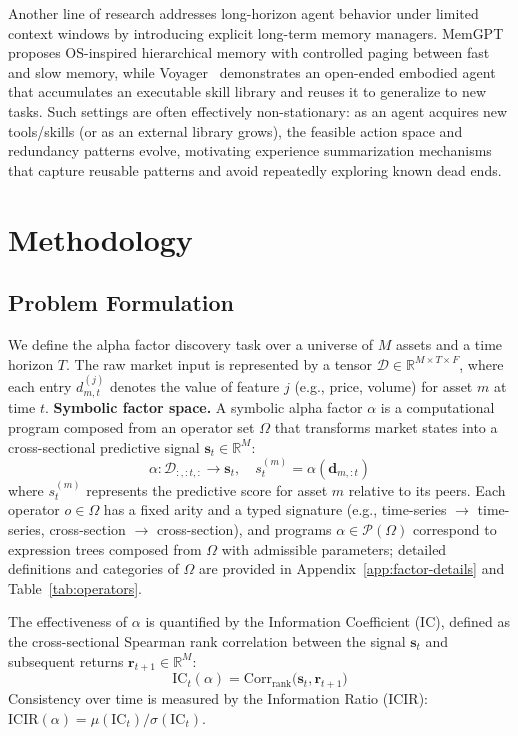 \documentclass[sigconf]{acmart}
\begin{document}
Another line of research addresses long-horizon agent behavior under limited context windows by introducing explicit long-term memory managers. MemGPT~\citep{packer2024memgpt} proposes OS-inspired hierarchical memory with controlled paging between fast and slow memory, while Voyager~\citep{wang2023voyager} demonstrates an open-ended embodied agent that accumulates an executable skill library and reuses it to generalize to new tasks. Such settings are often effectively non-stationary: as an agent acquires new tools/skills (or as an external library grows), the feasible action space and redundancy patterns evolve, motivating experience summarization mechanisms that capture reusable patterns and avoid repeatedly exploring known dead ends.

\section{Methodology}

\subsection{Problem Formulation}

We define the alpha factor discovery task over a universe of $M$ assets and a time horizon $T$. 
The raw market input is represented by a tensor $\mathcal{D} \in \mathbb{R}^{M \times T \times F}$, where each entry $d_{m,t}^{(j)}$ denotes the value of feature $j$ (e.g., price, volume) for asset $m$ at time $t$. 
\noindent\textbf{Symbolic factor space.}
A symbolic alpha factor $\alpha$ is a computational program composed from an operator set $\Omega$ that transforms market states into a cross-sectional predictive signal $\mathbf{s}_t \in \mathbb{R}^M$:
\begin{equation}
  \alpha: \mathcal{D}_{:, :t, :} \rightarrow \mathbf{s}_t, \quad s_{t}^{(m)} = \alpha(\mathbf{d}_{m,:t})
\end{equation}
where $s_{t}^{(m)}$ represents the predictive score for asset $m$ relative to its peers.
Each operator $o \in \Omega$ has a fixed arity and a typed signature (e.g., time-series $\rightarrow$ time-series, cross-section $\rightarrow$ cross-section), and programs $\alpha \in \mathcal{P}(\Omega)$ correspond to expression trees composed from $\Omega$ with admissible parameters; detailed definitions and categories of $\Omega$ are provided in Appendix~\ref{app:factor-details} and Table~\ref{tab:operators}.

The effectiveness of $\alpha$ is quantified by the Information Coefficient (IC), defined as the cross-sectional Spearman rank correlation between the signal $\mathbf{s}_t$ and subsequent returns $\mathbf{r}_{t+1} \in \mathbb{R}^M$:
\begin{equation}
  \text{IC}_t(\alpha) = \text{Corr}_{\text{rank}}\bigl(\mathbf{s}_t, \mathbf{r}_{t+1}\bigr)
\end{equation}
Consistency over time is measured by the Information Ratio (ICIR): $\text{ICIR}(\alpha) = \mu(\text{IC}_t) / \sigma(\text{IC}_t)$.
\end{document}
